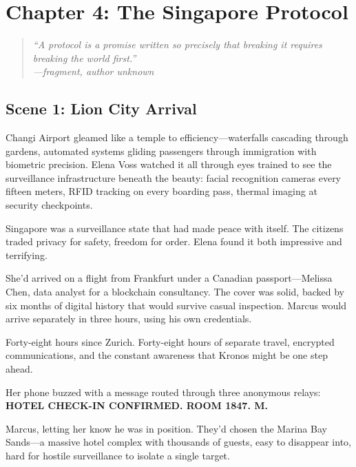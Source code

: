 \hypertarget{chapter-4-the-singapore-protocol}{%
\section{Chapter 4: The Singapore Protocol}\label{chapter-4-the-singapore-protocol}}

\begin{quote}
\itshape ``A protocol is a promise written so precisely that breaking it requires
breaking the world first.''\\
\normalfont\hfill---fragment, author unknown
\end{quote}

\hypertarget{scene-1-lion-city-arrival}{%
\subsection{Scene 1: Lion City Arrival}\label{scene-1-lion-city-arrival}}

Changi Airport gleamed like a temple to efficiency---waterfalls cascading through gardens, automated systems gliding passengers through immigration with biometric precision. Elena Voss watched it all through eyes trained to see the surveillance infrastructure beneath the beauty: facial recognition cameras every fifteen meters, RFID tracking on every boarding pass, thermal imaging at security checkpoints.

Singapore was a surveillance state that had made peace with itself. The citizens traded privacy for safety, freedom for order. Elena found it both impressive and terrifying.

She'd arrived on a flight from Frankfurt under a Canadian passport---Melissa Chen, data analyst for a blockchain consultancy. The cover was solid, backed by six months of digital history that would survive casual inspection. Marcus would arrive separately in three hours, using his own credentials.

Forty-eight hours since Zurich. Forty-eight hours of separate travel, encrypted communications, and the constant awareness that Kronos might be one step ahead.

Her phone buzzed with a message routed through three anonymous relays: \textbf{HOTEL CHECK-IN CONFIRMED. ROOM 1847. M.}

Marcus, letting her know he was in position. They'd chosen the Marina Bay Sands---a massive hotel complex with thousands of guests, easy to disappear into, hard for hostile surveillance to isolate a single target.

